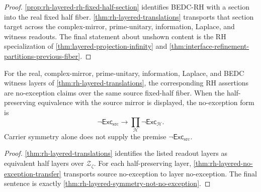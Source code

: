 \begin{proof}
\autoref{prop:rh-layered-rh-fixed-half-section} identifies BEDC-RH with a
section into the real fixed half fiber. \autoref{thm:rh-layered-translations}
transports that section target across the complex-mirror, prime-unitary,
information, Laplace, and witness readouts. The final statement about
unshown content is the RH specialization of
\autoref{thm:layered-projection-infinity} and
\autoref{thm:interface-refinement-partitions-previous-fiber}.
\end{proof}

\begin{theorem}
\label{thm:rh-layered-no-exception-form}
For the real, complex-mirror, prime-unitary, information, Laplace, and
BEDC witness layers of \autoref{thm:rh-layered-translations}, the
corresponding RH assertions are no-exception claims over the same source
fixed-half fiber. When the half-preserving equivalence with the source
mirror is displayed, the no-exception form is
$$
\neg\mathsf{Exc}_{\mathrm{src}}
\to
\prod_{\mathcal H}\neg\mathsf{Exc}_{\mathcal H}.
$$
Carrier symmetry alone does not supply the premise
$\neg\mathsf{Exc}_{\mathrm{src}}$.
\end{theorem}

\begin{proof}
\autoref{thm:rh-layered-translations} identifies the listed readout
layers as equivalent half layers over $\mathcal Z_{\zeta}$. For each
half-preserving layer, \autoref{thm:rh-layered-no-exception-transfer}
transports source no-exception to layer no-exception. The final sentence
is exactly \autoref{thm:rh-layered-symmetry-not-no-exception}.
\end{proof}


